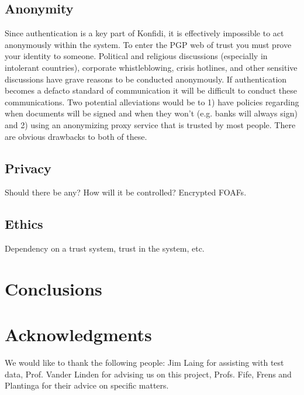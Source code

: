 \documentclass[onecolumn]{acm_proc_article-sp}
\begin{document}
\subsection{Anonymity}
Since authentication is a key part of Konfidi, it is effectively impossible to act anonymously within the system.  To enter the PGP web of trust you must prove your identity to someone.  Political and religious discussions (especially in intolerant countries), corporate whistleblowing, crisis hotlines, and other sensitive discussions have grave reasons to be conducted anonymously.  If authentication becomes a defacto standard of communication it will be difficult to conduct these communications.  Two potential alleviations would be to 1) have policies regarding when documents will be signed and when they won't (e.g. banks will always sign) and 2) using an anonymizing proxy service that is trusted by most people.  There are obvious drawbacks to both of these.\cite{fenton05iim}

\subsection{Privacy}
Should there be any?  How will it be controlled?
Encrypted FOAFs.

\subsection{Ethics}
Dependency on a trust system, trust in the system, etc.

\section{Conclusions}


\section{Acknowledgments}
We would like to thank the following people:  Jim Laing for assisting with test data, Prof. Vander Linden for advising us on this project, Profs. Fife, Frens and Plantinga for their advice on specific matters.

%
%
\end{document}
